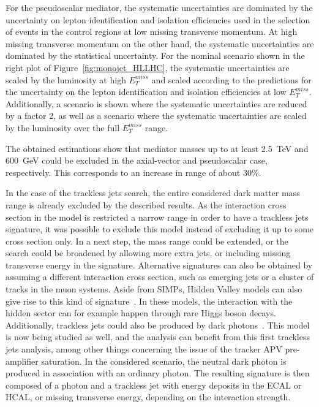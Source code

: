 For the pseudoscalar mediator, 
the systematic uncertainties are dominated by the uncertainty on lepton identification and isolation efficiencies used in the selection of events in the control regions at low missing transverse momentum. At high missing transverse momentum on the other hand, the systematic uncertainties are dominated by the statistical uncertainty. For the nominal scenario shown in the right plot of Figure~\ref{fig:monojet_HLLHC}, the systematic uncertainties are scaled by the luminosity at high $E_T^{miss}$ and scaled according to the predictions for the uncertainty on the lepton identification and isolation efficiencies at low $E_T^{miss}$. Additionally, a scenario is shown where the systematic uncertainties are reduced by a factor 2, as well as a scenario where the systematic uncertainties are scaled by the luminosity over the full $E_T^{miss}$ range. 

The obtained estimations show that mediator masses up to at least \SI{2.5}{TeV} and \SI{600}{GeV} could be excluded in the axial-vector and pseudoscalar case, respectively. This corresponds to an increase in range of about 30\%.

In the case of the trackless jets search, the entire considered dark matter mass range is already excluded by the described results. As the interaction cross section in the model is restricted a narrow range in order to have a trackless jets signature, it was possible to exclude this model instead of excluding it up to some cross section only. In a next step, the mass range could be extended, or the search could be broadened by allowing more extra jets, or including missing transverse energy in the signature. Alternative signatures can also be obtained by assuming a different interaction cross section, such as emerging jets or a cluster of tracks in the muon systems. Aside from \acp{SIMP}, Hidden Valley models can also give rise to this kind of signature~\cite{Strassler:2006im}. In these models, the interaction with the hidden sector can for example happen through rare Higgs boson decays. Additionally, trackless jets could also be produced by dark photons~\cite{Izaguirre:2015eya}. This model is now being studied as well, and the analysis can benefit from this first trackless jets analysis, among other things concerning the issue of the tracker APV pre-amplifier saturation. In the considered scenario, the neutral dark photon is produced in association with an ordinary photon. The resulting signature is then composed of a photon and a trackless jet with energy deposits in the \ac{ECAL} or \ac{HCAL}, or missing transverse energy, depending on the interaction strength. 



\clearpage{\pagestyle{empty}\cleardoublepage}
